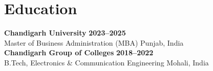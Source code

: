 \documentclass[10pt,a4paper]{article}
\begin{document}
\section*{Education}
\textbf{Chandigarh University} \hfill \textbf{2023--2025}\\
Master of Business Administration (MBA) \hfill Punjab, India\\[2pt]
\textbf{Chandigarh Group of Colleges} \hfill \textbf{2018--2022}\\
B.Tech, Electronics \& Communication Engineering \hfill Mohali, India
\end{document}
